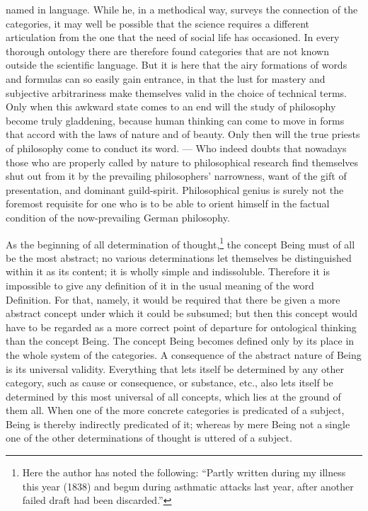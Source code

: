 \documentclass[12pt]{article}
\newcommand{\opage}[1]{\marginnote{\footnotesize\textit{[#1]}}}
\begin{document}
named in language. While he, in a methodical way, surveys the connection of the
categories, it may well be possible that the science requires a different articulation
from the one that the need of social life has occasioned. In every thorough ontology
there are therefore found categories that are not known outside the scientific
language. But it is here that the airy formations of words and formulas can so easily
gain entrance, in that the lust for mastery and subjective arbitrariness make
themselves valid in the choice of technical terms. Only when this awkward state comes
to an end will the study of philosophy become truly gladdening, because human thinking
can come to move in forms that accord with the laws of nature and of beauty. Only then
will the true priests of philosophy come to conduct its word. --- Who indeed doubts
that nowadays those who are properly called by nature to philosophical research find
themselves shut out from it by the prevailing philosophers' narrowness, want of the
gift of presentation, and dominant guild-spirit. Philosophical genius is surely not
the foremost requisite for one who is to be able to orient himself in the factual
condition of the now-prevailing German philosophy.

As the beginning of all determination of thought,\footnote{Here the author has noted
the following: ``Partly written during my illness this year (1838) and begun during
asthmatic attacks last year, after another failed draft had been discarded.''} the
concept Being must of all be the most abstract; no various determinations let
themselves be distinguished within it as its content; it is wholly simple and
indissoluble. Therefore it is impossible to give any definition of it in the usual
meaning of the word Definition. For that, namely, it would be required that there be
given a more abstract \opage{210}concept under which it could be subsumed; but then
this concept would have to be regarded as a more correct point of departure for
ontological thinking than the concept Being. The concept Being becomes defined only
by its place in the whole system of the categories. A consequence of the abstract
nature of Being is its universal validity. Everything that lets itself be determined
by any other category, such as cause or consequence, or substance, etc., also lets
itself be determined by this most universal of all concepts, which lies at the ground
of them all. When one of the more concrete categories is predicated of a subject,
Being is thereby indirectly predicated of it; whereas by mere Being not a single one
of the other determinations of thought is uttered of a subject.
\end{document}
